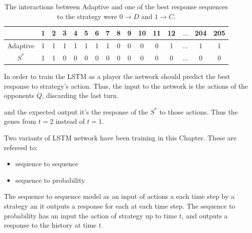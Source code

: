 \begin{table}[htbp]
    \centering
    \begin{tabular}{cccccccccccccccc}
        & \textbf{1} & \textbf{2} & \textbf{3} & \textbf{4}  & \textbf{5} & \textbf{6} & \textbf{7} & \textbf{8} & \textbf{9} & \textbf{10} & \textbf{11} &  \textbf{12} & \(\dots\)  & \textbf{204} &  \textbf{205} \\ 
        \midrule
        Adaptive & 1 & 1 & 1 & 1 & 1 & 1 & 1 & 0 & 0 & 0 & 0& 1& \(\dots\) & 1 & 1 \\
        \(S^*\) & 1 & 1 & 0 & 0 & 0 & 0 & 0 & 0 & 0 & 0 & 0 & 0& \(\dots\) & 0 & 0 \\ \bottomrule
    \end{tabular}
    \caption{The interactions between Adaptive and one of the best response sequences
    to the strategy were \(0 \to D\) and \(1 \to C\).}\label{table:adaptive_vs_best_response_binary}
\end{table}

In order to train the LSTM as a player the network should predict the best
response to strategy's action. Thus, the input to the network is the actions of
the opponents \(Q\), discarding the last turn.

\begin{figure}[!htbp]
    \centering
    
\end{figure}

and the expected output it's the response of the \(S^*\) to those actions.
Thus the genes from \(t=2\) instead of \(t=1\).

\begin{figure}[!htbp]
    \centering
    
\end{figure}

Two variants of LSTM network have been training in this Chapter. These are refereed to:

\begin{itemize}
    \item sequence to sequence
    \item sequence to probability
\end{itemize}

The sequence to sequence model as an input of actions a each time step by a strategy
an it outputs a response for each at each time step. The sequence to probability
has an input the action of strategy up to time \(t\), and outputs a response
to the history at time \(t\).


